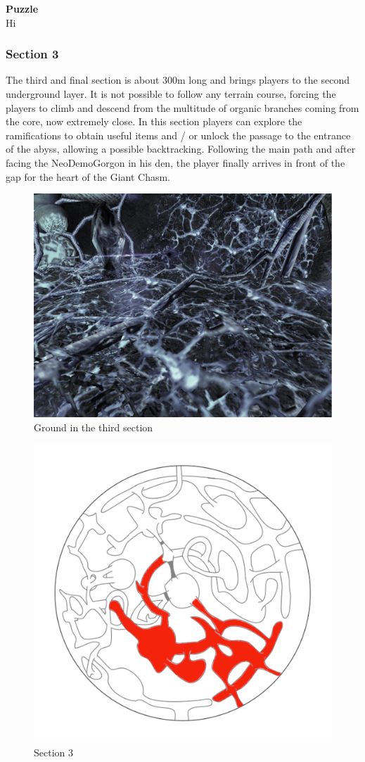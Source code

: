 \textbf{Puzzle}\\
Hi
\newpage

\subsubsection{Section 3}
The third and final section is about 300m long and brings players to the second underground layer. It is not possible to follow any terrain course, forcing the players to climb and descend from the multitude of organic branches coming from the core, now extremely close. In this section players can explore the ramifications to obtain useful items and / or unlock the passage to the entrance of the abyss, allowing a possible backtracking. Following the main path and after facing the NeoDemoGorgon in his den, the player finally arrives in front of the gap for the heart of the Giant Chasm.

\vspace*{0.3cm}
\begin{figure}[H]
	\centering
	\includegraphics[width=0.8\linewidth]{images/visual_ref/15_giant_chasm/chasm_section_3.jpg}
	\caption*{Ground in the third section}
\end{figure}

\begin{figure}[H]
	\centering
	\includegraphics[width=0.7\linewidth]{images/map/2D_map_section_03.png}
	\caption*{Section 3}
\end{figure}

